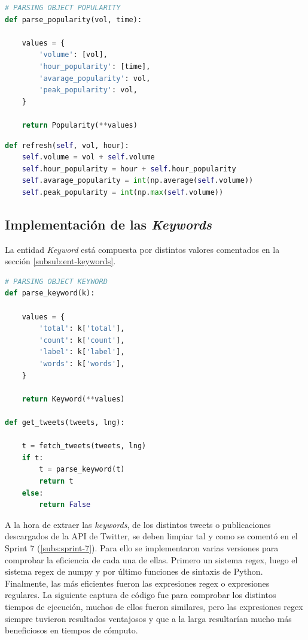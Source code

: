 \begin{lstlisting}[caption=Estructuración de la popularidad,          label={lst:listing-python},language=Python]
# PARSING OBJECT POPULARITY
def parse_popularity(vol, time):

    values = {
        'volume': [vol],
        'hour_popularity': [time],
        'avarage_popularity': vol,
        'peak_popularity': vol,
    }

    return Popularity(**values)
\end{lstlisting}

\begin{lstlisting}[caption=Actualización de la popularidad,          label={lst:listing-python},language=Python]
def refresh(self, vol, hour):
    self.volume = vol + self.volume
    self.hour_popularity = hour + self.hour_popularity
    self.avarage_popularity = int(np.average(self.volume))
    self.peak_popularity = int(np.max(self.volume))
\end{lstlisting}

\subsection{Implementación de las \textit{Keywords}}
La entidad \textit{Keyword} está compuesta por distintos valores comentados en la sección \ref{subsub:ent-keywords}.

\vspace{0.3cm}

\begin{lstlisting}[caption=Estructuración de las keywords,          label={lst:listing-python},language=Python]
# PARSING OBJECT KEYWORD
def parse_keyword(k):

    values = {
        'total': k['total'],
        'count': k['count'],
        'label': k['label'],
        'words': k['words'],
    }

    return Keyword(**values)

def get_tweets(tweets, lng):

    t = fetch_tweets(tweets, lng)
    if t:
        t = parse_keyword(t)
        return t
    else:
        return False
\end{lstlisting}

A la hora de extraer las \textit{keywords}, de los distintos tweets o publicaciones descargados de la API de Twitter, se deben limpiar tal y como se comentó en el Sprint 7 (\ref{subs:sprint-7}). Para ello se implementaron varias versiones para comprobar la eficiencia de cada una de ellas. Primero un sistema regex, luego el sistema regex de numpy y por último funciones de sintaxis de Python. Finalmente, las más eficientes fueron las expresiones regex o expresiones regulares. La siguiente captura de código fue para comprobar los distintos tiempos de ejecución, muchos de ellos fueron similares, pero las expresiones regex siempre tuvieron resultados ventajosos y que a la larga resultarían mucho más beneficiosos en tiempos de cómputo.

